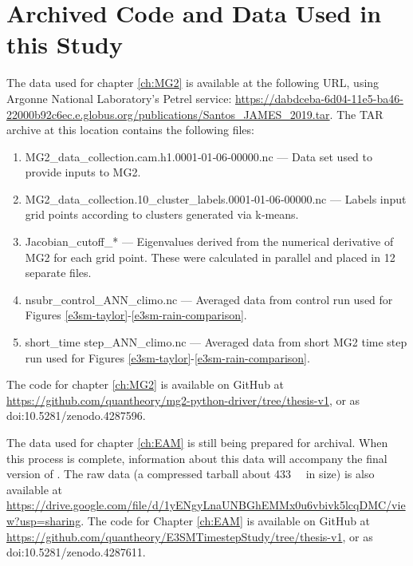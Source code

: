 \documentclass [11pt, proquest] {uwthesis}[2020/02/24]
\begin{document}
 
\chapter{Archived Code and Data Used in this Study}

The data used for chapter \ref{ch:MG2} is available at the following URL, using Argonne National Laboratory's Petrel service: \url{https://dabdceba-6d04-11e5-ba46-22000b92c6ec.e.globus.org/publications/Santos_JAMES_2019.tar}. The TAR archive at this location contains the following files:
\begin{enumerate}
    \item MG2\_data\_collection.cam.h1.0001‐01‐06‐00000.nc --- Data set used to provide inputs to MG2.
    \item MG2\_data\_collection.10\_cluster\_labels.0001‐01‐06‐00000.nc --- Labels input grid points according to clusters generated via k‐means.
    \item Jacobian\_cutoff\_* --- Eigenvalues derived from the numerical derivative of MG2 for each grid point. These were calculated in parallel and placed in 12 separate files.
    \item nsubr\_control\_ANN\_climo.nc --- Averaged data from control run used for Figures \ref{e3sm-taylor}-\ref{e3sm-rain-comparison}.
    \item short\_time step\_ANN\_climo.nc --- Averaged data from short MG2 time step run used for Figures \ref{e3sm-taylor}-\ref{e3sm-rain-comparison}.
\end{enumerate}

The code for chapter \ref{ch:MG2} is available on GitHub at \url{https://github.com/quantheory/mg2-python-driver/tree/thesis-v1}, or as doi:10.5281/zenodo.4287596.

The data used for chapter \ref{ch:EAM} is still being prepared for archival. When this process is complete, information about this data will accompany the final version of \cite{Santos2020}. The raw data (a compressed tarball about \SI{433}{\giga\byte} in size) is also available at \url{https://drive.google.com/file/d/1yENgyLnaUNBGhEMMx0u6vbivk5lcqDMC/view?usp=sharing}. The code for Chapter \ref{ch:EAM} is available on GitHub at \url{https://github.com/quantheory/E3SMTimestepStudy/tree/thesis-v1}, or as doi:10.5281/zenodo.4287611.
\end{document}
